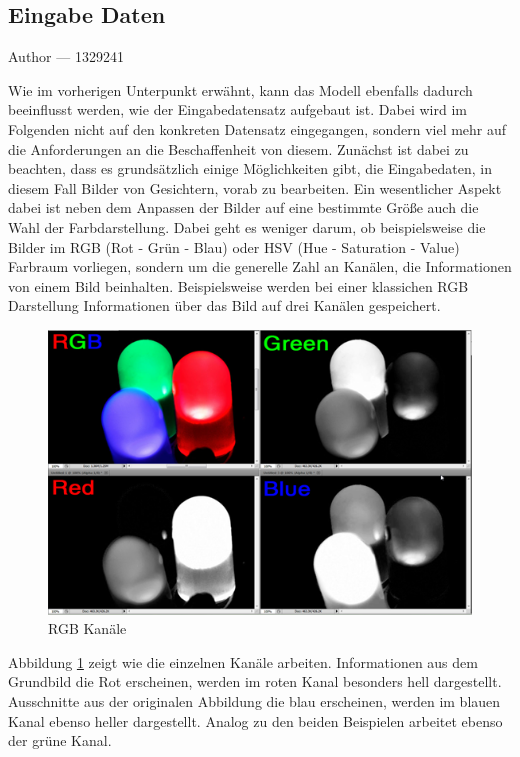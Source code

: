 \documentclass[12pt, a4paper]{report}
\makeatletter
\newcommand*\setcaptioncitation[1]{\def\captioncitation{\textit{Quelle:}~#1}}
\let\captioncitation\relax
\newcommand{\sectionauthor}[1]{%
  {\parindent0pt\vspace*{-5pt}%
  \large{Author --- }
  \linespread{1.1}\large\scshape#1%
  \par\nobreak\vspace*{35pt} }
  \@afterheading%
}
\makeatother
\begin{document}
\subsection{Eingabe Daten}
\sectionauthor{1329241}
\label{subsec: Eingabe Daten}
Wie im vorherigen Unterpunkt erwähnt, kann das Modell ebenfalls dadurch beeinflusst werden, wie der Eingabedatensatz aufgebaut ist. Dabei wird im Folgenden nicht auf den konkreten Datensatz eingegangen, sondern viel mehr auf die Anforderungen an die Beschaffenheit von diesem. Zunächst ist dabei zu beachten, dass es grundsätzlich einige Möglichkeiten gibt, die Eingabedaten, in diesem Fall Bilder von Gesichtern, vorab zu bearbeiten. Ein wesentlicher Aspekt dabei ist neben dem Anpassen der Bilder auf eine bestimmte Größe auch die Wahl der Farbdarstellung. Dabei geht es weniger darum, ob beispielsweise die Bilder im RGB (Rot - Grün - Blau) oder HSV (Hue - Saturation - Value) Farbraum vorliegen, sondern um die generelle Zahl an Kanälen, die Informationen von einem Bild beinhalten. Beispielsweise werden bei einer klassichen RGB Darstellung Informationen über das Bild auf drei Kanälen gespeichert. 
\begin{figure}[h]
\includegraphics[width=\linewidth]{Bilder/RGB.png}
\setcaptioncitation{ https://www.howtogeek.com/wp-content/uploads/2011/02/sshot-74.png}
\caption{RGB Kanäle}
\label{fig: RGB}
\end{figure}
Abbildung \ref{fig: RGB} zeigt wie die einzelnen Kanäle arbeiten. Informationen aus dem Grundbild die Rot erscheinen, werden im roten Kanal besonders hell dargestellt. 
Ausschnitte aus der originalen Abbildung die blau erscheinen, werden im blauen Kanal ebenso heller dargestellt. Analog zu den beiden Beispielen arbeitet ebenso der grüne Kanal.
\end{document}
